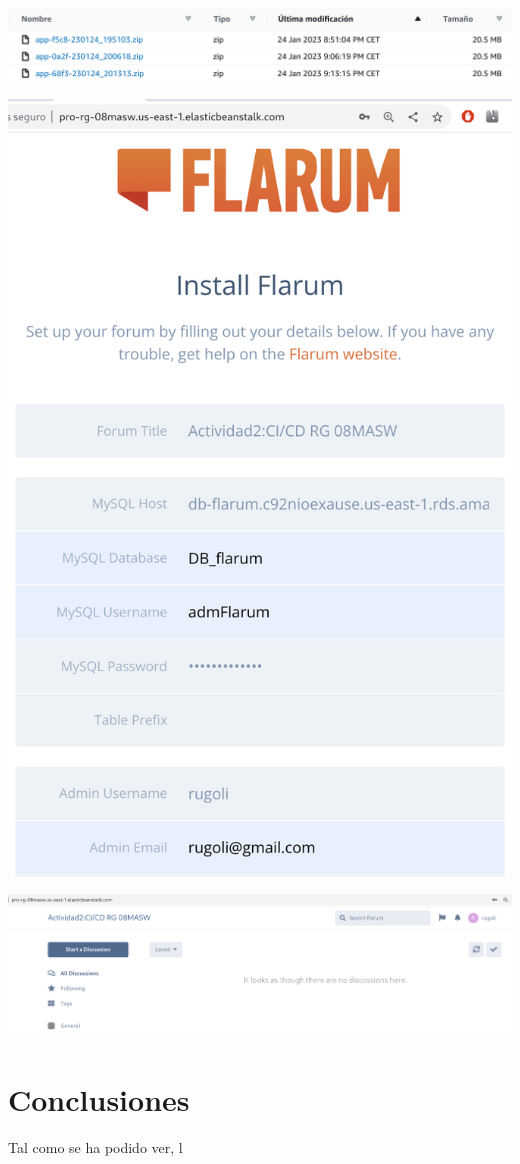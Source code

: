 \documentclass{\ClassPath/viu-tfm-template}
\begin{document}
\begin{center}
    \includegraphics[frame,width=\linewidth]{img/s3.png}
\end{center}



\begin{center}
    \includegraphics[frame,width=0.63\linewidth]{img/flarum-2.png}
\end{center}

\begin{center}
    \includegraphics[frame,width=\linewidth]{img/flarum-3.png}
\end{center}






\chapter{Conclusiones}

Tal como se ha podido ver, l
\end{document}

